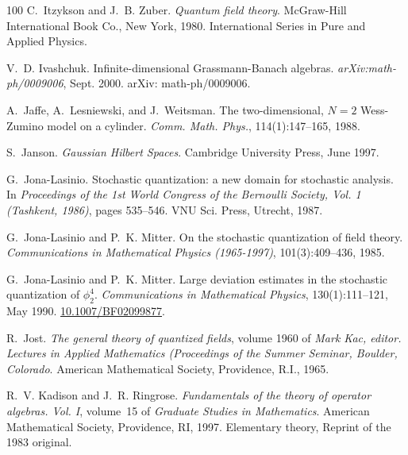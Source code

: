 \documentclass[11pt]{article}
\newcommand{\tmtextit}[1]{{\itshape{#1}}}
\begin{document}
\begin{thebibliography}{100}
  C.~Itzykson and J.~B. Zuber.
  {\newblock}\tmtextit{Quantum field theory}. {\newblock}McGraw-Hill
  International Book Co., New York, 1980. {\newblock}International Series in
  Pure and Applied Physics.
  
  V.~D. Ivashchuk.
  {\newblock}Infinite-dimensional Grassmann-Banach algebras.
  {\newblock}\tmtextit{arXiv:math-ph/0009006}, Sept. 2000. {\newblock}arXiv:
  math-ph/0009006.
  
  A.~Jaffe, A.~Lesniewski, and J.~Weitsman.
  {\newblock}The two-dimensional, $N = 2$ Wess-Zumino model on a cylinder.
  {\newblock}\tmtextit{Comm. Math. Phys.}, 114(1):147--165, 1988.
  
  S.~Janson. {\newblock}\tmtextit{Gaussian
  Hilbert Spaces}. {\newblock}Cambridge University Press, June 1997.
  
  G.~Jona-Lasinio.
  {\newblock}Stochastic quantization: a new domain for stochastic analysis.
  {\newblock}In \tmtextit{Proceedings of the 1st World Congress of the
  Bernoulli Society, Vol. 1 (Tashkent, 1986)}, pages 535--546. VNU Sci. Press,
  Utrecht, 1987.
  
  G.~Jona-Lasinio and P.~K. Mitter.
  {\newblock}On the stochastic quantization of field theory.
  {\newblock}\tmtextit{Communications in Mathematical Physics (1965-1997)},
  101(3):409--436, 1985.
  
  G.~Jona-Lasinio and P.~K. Mitter.
  {\newblock}Large deviation estimates in the stochastic quantization of
  $\phi^4_2$. {\newblock}\tmtextit{Communications in Mathematical Physics},
  130(1):111--121, May 1990.
  {\newblock}\href{https://doi.org/10.1007/BF02099877}{10.1007/BF02099877}.
  
  R.~Jost. {\newblock}\tmtextit{The general
  theory of quantized fields}, volume 1960 of \tmtextit{Mark Kac, editor.
  Lectures in Applied Mathematics (Proceedings of the Summer Seminar, Boulder,
  Colorado}. {\newblock}American Mathematical Society, Providence, R.I., 1965.
  
  R.~V. Kadison and J.~R. Ringrose.
  {\newblock}\tmtextit{Fundamentals of the theory of operator algebras. Vol.
  I}, volume~15 of \tmtextit{Graduate Studies in Mathematics}.
  {\newblock}American Mathematical Society, Providence, RI, 1997.
  {\newblock}Elementary theory, Reprint of the 1983 original.
  

\end{thebibliography}
\end{document}
